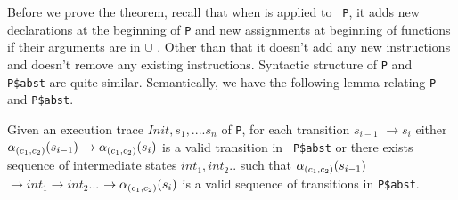

Before we prove the theorem, recall that when \tr{} is applied to {\tt
  P}, it adds new declarations at the beginning of {\tt P} and new
assignments at beginning of functions if their arguments are in
\indexids{} \(\cup\) \arrayids. Other than that it doesn’t add any new
instructions and doesn’t remove any existing
instructions. Syntactic structure of {\tt P} and {\tt
  P\$abst} are quite similar. Semantically, we have the following
lemma relating {\tt P} and {\tt P\$abst}.

\begin{lemma}
  Given an execution trace \(Init, s_1,....s_n\) of {\tt P}, for each
  transition \(s_{i-1}\) \(\rightarrow s_{i}\) either
  \(\alpha_{(c_1,c_2)}(s_{i-1})\) \(\rightarrow \alpha_{(c_1,c_2)}(s_{i})\) is a valid transition in {\tt
    P\$abst} or there exists sequence of intermediate states \(int_{1}, int_{2}..\) such that \(\alpha_{(c_1,c_2)}(s_{i-1})\)
  \(\rightarrow int_{1} \rightarrow int_{2} ...\) \(\rightarrow \alpha_{(c_1,c_2)}(s_i)\) is a valid
  sequence of transitions in {\tt P\$abst}.
\end{lemma}

